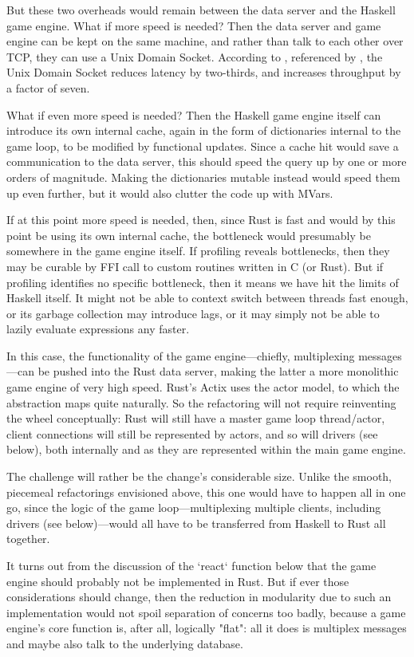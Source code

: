 But these two overheads would remain between the data server and the Haskell
game engine.
What if more speed is needed?
Then the data server and game engine can be kept on the same machine, and rather than talk to each other
over TCP, they can use a Unix Domain Socket.
According to
,
referenced by
,
the Unix Domain Socket reduces latency by two-thirds, and increases throughput
by a factor of seven.

What if even more speed is needed?
Then the Haskell game engine itself can introduce its own internal cache,
again in the form of dictionaries internal to the game loop, to be modified by
functional updates.
Since a cache hit would save a communication to the data server,
this should speed the query up by one or more orders of magnitude.
Making the dictionaries mutable instead would speed them up even further,
but it would also clutter the code up with MVars.

If at this point more speed is needed, then, since Rust is fast and would by
this point be using its own internal cache, the bottleneck would presumably be
somewhere in the game engine itself.
If profiling reveals bottlenecks,
then they may be curable by FFI call to custom routines written in C (or Rust).
But if profiling identifies no specific bottleneck, then it means we have hit
the limits of Haskell itself.
It might not be able to context switch between threads fast enough,
or its garbage collection may introduce lags, or it may simply not be able to
lazily evaluate expressions any faster.

In this case, the functionality of the game engine---chiefly, multiplexing
messages---can be pushed into the Rust data server, making the latter a more
monolithic game engine of very high speed.
Rust's Actix uses the actor model,
to which the  abstraction maps quite naturally.
So the refactoring will not require reinventing the wheel conceptually:
Rust will still have a master game loop thread/actor,
client connections will still be represented by actors,
and so will drivers (see below),
both internally and as they are represented within the main game engine.

The challenge will rather be the change's considerable size.
Unlike the smooth, piecemeal refactorings envisioned above,
this one would have to happen all in one go,
since the logic of the game loop---multiplexing multiple clients, including
drivers (see below)---would all have to be transferred from
Haskell to Rust all together.

It turns out from the discussion of the `react` function below that the game
engine should probably not be implemented in Rust.
But if ever those
considerations should change, then the reduction in modularity due to
such an implementation would not spoil separation of concerns too badly,
because a game engine's
core function is, after all, logically "flat": all it does is multiplex
messages and maybe also talk to the underlying database.
